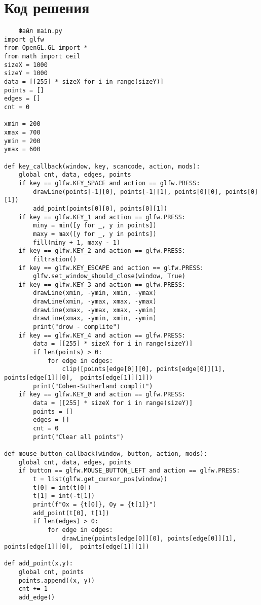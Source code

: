 \documentclass[a4paper, 14pt]{extarticle}
\begin{document}
\section{Код решения}
\begin{verbatim}
    Файл main.py
import glfw
from OpenGL.GL import *
from math import ceil
sizeX = 1000
sizeY = 1000
data = [[255] * sizeX for i in range(sizeY)]
points = []
edges = []
cnt = 0

xmin = 200
xmax = 700
ymin = 200
ymax = 600

def key_callback(window, key, scancode, action, mods):
    global cnt, data, edges, points
    if key == glfw.KEY_SPACE and action == glfw.PRESS:
        drawLine(points[-1][0], points[-1][1], points[0][0], points[0][1])
        add_point(points[0][0], points[0][1])
    if key == glfw.KEY_1 and action == glfw.PRESS:
        miny = min([y for _, y in points])
        maxy = max([y for _, y in points])
        fill(miny + 1, maxy - 1)
    if key == glfw.KEY_2 and action == glfw.PRESS:
        filtration()
    if key == glfw.KEY_ESCAPE and action == glfw.PRESS:
        glfw.set_window_should_close(window, True)
    if key == glfw.KEY_3 and action == glfw.PRESS:
        drawLine(xmin, -ymin, xmin, -ymax)
        drawLine(xmin, -ymax, xmax, -ymax)
        drawLine(xmax, -ymax, xmax, -ymin)
        drawLine(xmax, -ymin, xmin, -ymin)
        print("drow - complite")
    if key == glfw.KEY_4 and action == glfw.PRESS:
        data = [[255] * sizeX for i in range(sizeY)]
        if len(points) > 0:
            for edge in edges:
                clip([points[edge[0]][0], points[edge[0]][1], points[edge[1]][0],  points[edge[1]][1]])
        print("Cohen-Sutherland complit")
    if key == glfw.KEY_0 and action == glfw.PRESS:
        data = [[255] * sizeX for i in range(sizeY)]
        points = []
        edges = []
        cnt = 0
        print("Clear all points")

def mouse_button_callback(window, button, action, mods):
    global cnt, data, edges, points
    if button == glfw.MOUSE_BUTTON_LEFT and action == glfw.PRESS:
        t = list(glfw.get_cursor_pos(window))
        t[0] = int(t[0])
        t[1] = int(-t[1])
        print(f"Ox = {t[0]}, Oy = {t[1]}")
        add_point(t[0], t[1])
        if len(edges) > 0:
            for edge in edges:
                drawLine(points[edge[0]][0], points[edge[0]][1], points[edge[1]][0],  points[edge[1]][1])

def add_point(x,y):
    global cnt, points
    points.append((x, y))
    cnt += 1
    add_edge()


\end{verbatim}
\end{document}

